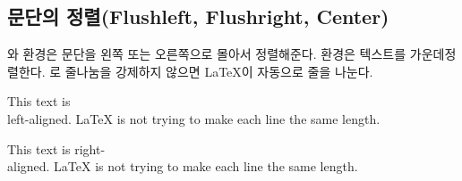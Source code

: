 \subsection{문단의 정렬(Flushleft, Flushright, Center)}

와  환경은 문단을 왼쪽 또는 오른쪽으로 
몰아서 정렬해준다.  환경은 텍스트를 가운데정렬한다.
\ci{\bs}로 줄나눔을 강제하지 않으면 \LaTeX 이 자동으로 줄을 나눈다.

\begin{example}
\begin{flushleft}
This text is\\ left-aligned.
\LaTeX{} is not trying to make
each line the same length.
\end{flushleft}
\end{example}

\vspace{-.5\onelineskip}

\begin{example}
\begin{flushright}
This text is right-\\aligned.
\LaTeX{} is not trying to make
each line the same length.
\end{flushright}
\end{example}

